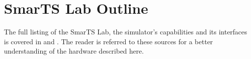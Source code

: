 \documentclass[journal]{IEEEtran}
\begin{document}

\section{SmarTS Lab Outline}



%

The full listing of the SmarTS Lab, the simulator's capabilities and its interfaces is covered in \cite{PhasorPODImplement} and \cite{SmarTSLab}. The reader is referred to these sources for a better understanding of the hardware described here.
\end{document}
